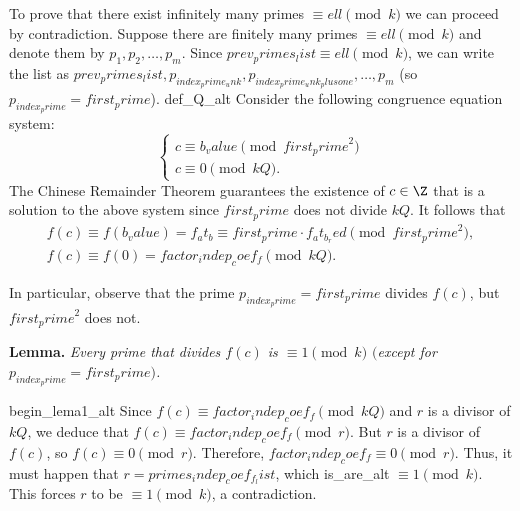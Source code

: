 To prove that there exist infinitely many primes $\equiv {ell} \pmod{{k}}$ we can proceed by contradiction. Suppose there are finitely many primes $\equiv {ell}\pmod{{k}}$ and denote them by $p_1, p_2,\dots,p_m$. Since ${prev_primes_list} \equiv {ell} \pmod{{k}}$, we can write the list as ${prev_primes_list}, p_{{index_prime_unk}},p_{{index_prime_unk_plusone}},\dots, p_m$ (so $p_{{index_prime}}={first_prime}$). {def_Q_alt} Consider the following congruence equation system:
	\begin{equation*}
        \begin{cases}      
		c\equiv {b_value}\pmod{{first_prime}^2}\\
		c\equiv 0\pmod{{k}Q}.
        \end{cases}
	\end{equation*}
The Chinese Remainder Theorem guarantees the existence of $c\in\Z$ that is a solution to the above system since ${first_prime}$ does not divide ${k}Q$. It follows that 
	\begin{gather*}
		f(c)\equiv f({b_value})={f_at_b}\equiv {first_prime}\cdot{f_at_b_red}\pmod{{first_prime}^2},\\
        f(c)\equiv f(0)={factor_indep_coef_f}\pmod{{k}Q}.
	\end{gather*}

In particular, observe that the prime $p_{{index_prime}}={first_prime}$ divides $f(c)$, but ${first_prime}^2$ does not.

\textbf{Lemma.} \emph{Every prime that divides $f(c)$ is $\equiv 1\pmod{{k}}$ $($except for $p_{{index_prime}}={first_prime})$.} 

{begin_lema1_alt} Since $f(c)\equiv {factor_indep_coef_f}\pmod{{k}Q}$ and $r$ is a divisor of ${k}Q$, we deduce that $f(c)\equiv {factor_indep_coef_f}\pmod{r}$. But $r$ is a divisor of $f(c)$, so $f(c)\equiv 0 \pmod{r}$. Therefore, ${factor_indep_coef_f}\equiv 0\pmod{r}$. Thus, it must happen that $r={primes_indep_coef_f_list}$, which {is_are_alt} $\equiv 1 \pmod{{k}}$. This forces $r$ to be $\equiv 1 \pmod{{k}}$, a contradiction.